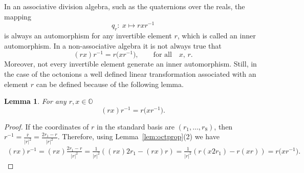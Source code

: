 \documentclass[pdftex]{sigma}
\numberwithin{equation}{section}
\newtheorem{Lemma}[Theorem]{Lemma}
\newcommand{\SO}{\mathbb{O}} %
\begin{document}
In an associative division algebra, such as the quaternions over the reals, the mapping
\[ q_r\colon \ x\mapsto rxr^{-1} \]
is always an automorphism for any invertible element $r$, which is called an inner automorphism. In a non-associative algebra it is not always true that
\[(rx)r^{-1}=r\big(xr^{-1}\big), \qquad \textrm{for all} \quad x,\,r.\]
Moreover, not every invertible element generate an inner automorphism. Still, in the case of the octonions a well defined linear transformation associated with an element $r$ can be defined because of the following lemma.
\begin{Lemma} \label{lem:innautass} For any $r,x \in \SO$
 \[(rx)r^{-1}=r\big(xr^{-1}\big).\]
\end{Lemma}
\begin{proof}If the coordinates of $r$ in the standard basis are $(r_1,\dots,r_8)$, then $r^{-1}=\frac{\bar{r}}{|r|^2}=\frac{2r_1-r}{|r|^2}$. Therefore, using Lemma~\ref{lem:octprop}(2) we have
 \begin{gather*} (rx)r^{-1} =(rx)\frac{2r_1-r}{|r|^2}=\frac{1}{|r|^2}( (rx)2r_1-(rx)r )= \frac{1}{|r|^2}( r(x2r_1)-r(xr) )= r\big(xr^{-1}\big).\tag*{\qed} \end{gather*}
\renewcommand{\qed}{}
\end{proof}
\end{document}
